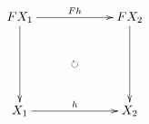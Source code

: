 \documentclass[12pt]{article}
\begin{document}
\pagestyle{empty}

\begin{align*}
  \vcenter{
    \xymatrix@=60pt{
      F X_1
      \ar@{->}[r]^{F h}
      \ar@{->}[d]
      \ar@{{}{ }{}}[rd]|{\circlearrowright}
      &
      F X_2
      \ar@{->}[d]
      \\
      X_1
      \ar@{->}[r]^{h}
      &
      X_2
    }
  }
\end{align*}
\end{document}
